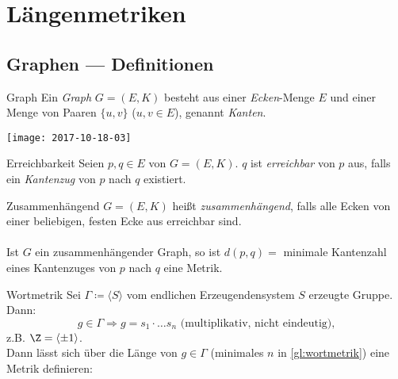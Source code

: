 \chapter{Längenmetriken}

\section{Graphen --- Definitionen}

\begin{definition}{Graph}
  Ein \emph{Graph} $ G = (E, K) $ besteht aus einer \emph{Ecken}-Menge $ E $ und einer Menge von Paaren $ \{ u, v \} $ ($ u, v \in E $), genannt \emph{Kanten}.
\end{definition}

\begin{marginfigure}
    \texttt{[image: 2017-10-18-03]}
    \caption{Ein einfacher Graph. Dieser Graph ist \underline{nicht} zusammenhängend, da die Ecke $ 1 $ nicht von den anderen Ecken aus erreicht werden kann.}
\end{marginfigure}

\begin{definition}{Erreichbarkeit}
  Seien $ p, q \in E $ von $ G = (E, K) $. $ q $ ist \emph{erreichbar} von $ p $ aus, falls ein \emph{Kantenzug} von $ p $ nach $ q $ existiert.
\end{definition}

\begin{definition}{Zusammenhängend}
  $ G = (E, K) $ heißt \emph{zusammenhängend}, falls alle Ecken von einer beliebigen, festen Ecke aus erreichbar sind.
  \\ \ \\
  Ist $ G $ ein zusammenhängender Graph, so ist $ d(p, q) = $ minimale Kantenzahl eines Kantenzuges von $ p $ nach $ q $ eine Metrik.
\end{definition}

\begin{example}{Wortmetrik}
  Sei $ \Gamma \coloneqq \langle S \rangle $ vom endlichen Erzeugendensystem $ S $ erzeugte Gruppe. Dann:
  \begin{equation}
    \label{gl:wortmetrik}
    g \in \Gamma \Rightarrow g = s_1\cdot \dots s_n\text{ (multiplikativ, nicht eindeutig),}
  \end{equation}
  z.B. $ \Z = \langle \pm 1 \rangle $. \\
  Dann lässt sich über die Länge von $ g \in \Gamma $ (minimales $ n $ in \autoref{gl:wortmetrik}) eine Metrik definieren:
\end{example}

